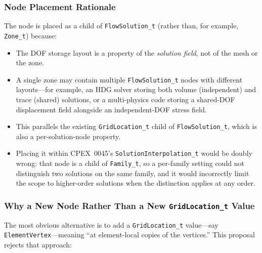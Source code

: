 \documentclass[11pt,letterpaper]{article}
\begin{document}
\subsubsection{Node Placement Rationale}

The node is placed as a child of \texttt{FlowSolution\_t} (rather
than, for example, \texttt{Zone\_t}) because:

\begin{itemize}[leftmargin=2em]
\item The DOF storage layout is a property of the \emph{solution field},
  not of the mesh or the zone.

\item A single zone may contain multiple \texttt{FlowSolution\_t}
  nodes with different layouts---for example, an HDG solver
  storing both volume (independent) and trace (shared) solutions,
  or a multi-physics code storing a shared-DOF displacement field
  alongside an independent-DOF stress field.

\item This parallels the existing \texttt{GridLocation\_t} child of
  \texttt{FlowSolution\_t}, which is also a per-solution-node
  property.

\item Placing it within CPEX~0045's \texttt{SolutionInterpolation\_t}
  would be doubly wrong: that node is a child of \texttt{Family\_t},
  so a per-family setting could not distinguish two solutions on the
  same family, and it would incorrectly limit the scope to
  higher-order solutions when the distinction applies at any order.
\end{itemize}

\subsubsection{Why a New Node Rather Than a New \texttt{GridLocation\_t} Value}
\label{sec:why-new-node}

The most obvious alternative is to add a \texttt{GridLocation\_t}
value---say \texttt{ElementVertex}---meaning ``at element-local copies
of the vertices.''  This proposal rejects that approach:
\end{document}
